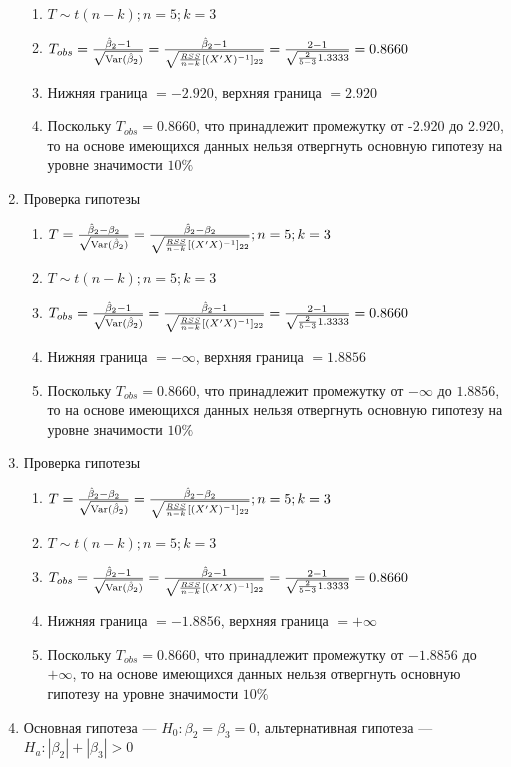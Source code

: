 \begin{problem}
\begin{sol}
\begin{enumerate}
\begin{enumerate}
\item $T \sim t(n-k); n = 5; k = 3$
\item $T_{obs} = \frac{\hat{\beta}_2 - 1}{\sqrt{\operatorname{Var}(\hat{\beta}_2)}} = \frac {\hat{\beta}_2 - 1}{\sqrt{{\frac{RSS}{n-k}}[(X'X)^{-1}]_{22}}} = \frac{2-1}{\sqrt{{\frac{2}{5-3}}1.3333}} = 0.8660$
\item Нижняя граница $= -2.920$, верхняя граница $= 2.920$
\item Поскольку $T_{obs} = 0.8660$, что принадлежит промежутку от -2.920 до 2.920, то на основе имеющихся данных нельзя отвергнуть основную гипотезу на уровне значимости $10\%$
\end{enumerate}
\item Проверка гипотезы
\begin{enumerate}
\item $T = \frac{\hat{\beta}_2 - \beta_2}{\sqrt{\operatorname{Var}(\hat{\beta}_2)}} = \frac {\hat{\beta}_2 - \beta_2}{\sqrt{{\frac{RSS}{n-k}}[(X'X)^{-1}]_{22}}}; n = 5; k = 3$
\item $T \sim t(n-k); n = 5; k = 3$
\item $T_{obs} = \frac{\hat{\beta}_2 - 1}{\sqrt{\operatorname{Var}(\hat{\beta}_2)}} = \frac {\hat{\beta}_2 - 1}{\sqrt{{\frac{RSS}{n-k}}[(X'X)^{-1}]_{22}}} = \frac{2-1}{\sqrt{{\frac{2}{5-3}}1.3333}} = 0.8660$
\item Нижняя граница $= -\infty$, верхняя граница $= 1.8856$
\item Поскольку $T_{obs} = 0.8660$, что принадлежит промежутку от $-\infty$ до $1.8856$, то на основе имеющихся данных нельзя отвергнуть основную гипотезу на уровне значимости $10\%$
\end{enumerate}
\item Проверка гипотезы
\begin{enumerate}
\item $T = \frac{\hat{\beta}_2 - \beta_2}{\sqrt{\operatorname{Var}(\hat{\beta}_2)}} = \frac {\hat{\beta}_2 - \beta_2}{\sqrt{{\frac{RSS}{n-k}}[(X'X)^{-1}]_{22}}}; n = 5; k = 3$
\item $T \sim t(n-k); n = 5; k = 3$
\item $T_{obs} = \frac{\hat{\beta}_2 - 1}{\sqrt{\operatorname{Var}(\hat{\beta}_2)}} = \frac {\hat{\beta}_2 - 1}{\sqrt{{\frac{RSS}{n-k}}[(X'X)^{-1}]_{22}}} = \frac{2-1}{\sqrt{{\frac{2}{5-3}}1.3333}} = 0.8660$
\item Нижняя граница $= -1.8856$, верхняя граница $= +\infty$
\item Поскольку $T_{obs} = 0.8660$, что принадлежит промежутку от $-1.8856$ до $+\infty$, то на основе имеющихся данных нельзя отвергнуть основную гипотезу на уровне значимости $10\%$
\end{enumerate}
\item Основная гипотеза — $H_0: \beta_2 = \beta_3 = 0$, альтернативная гипотеза — $H_a: |\beta_2| + |\beta_3| > 0$

\end{enumerate}
\end{sol}
\end{problem}
